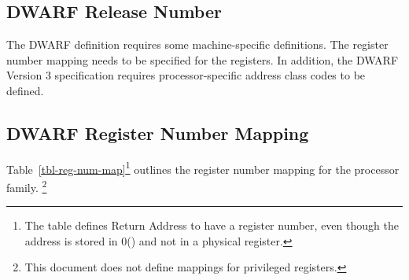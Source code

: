 \subsection{DWARF Release Number}

The DWARF definition requires some machine-specific definitions.
The register number mapping needs to be specified for the \xARCH
registers. In addition, the DWARF Version 3 specification
requires processor-specific address class codes to be defined.

\subsection{DWARF Register Number Mapping}

Table~\ref{tbl-reg-num-map}\footnote{The table defines Return Address
  to have a register number, even though the address is stored in
  0(\RSP) and not in a physical register.}  outlines the register
number mapping for the \xARCH processor family.%
\footnote{This document does not define mappings for privileged registers.}%

